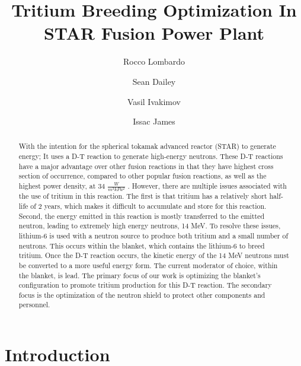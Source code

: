 \documentclass[runningheads]{llncs}
\begin{document}
%
\title{Tritium Breeding Optimization In STAR Fusion Power Plant}
%
%
\author{Rocco Lombardo \and
Sean Dailey\and
Vasil Ivakimov\and
Issac James}
%
%
%
\maketitle     %
%
\begin{abstract} 
With the intention for the spherical tokamak advanced reactor (STAR) to generate energy; It uses a D-T reaction to generate high-energy neutrons. 
These D-T reactions have a major advantage over other fusion reactions in that they have highest cross section of occurrence, compared to other popular fusion reactions, as well as the highest power density, at 34 $\frac{W}{m^3kPa^2}$
\cite{khodak2025}. 
However, there are multiple issues associated with the use of tritium in this reaction. The first is that tritium has a relatively short half-life of 2 years, which makes it difficult to accumulate and store for this reaction. Second, the energy emitted in this reaction is mostly transferred to the emitted neutron, leading to extremely high energy neutrons, 14 MeV. To resolve these issues, lithium-6 is used with a neutron source to produce both tritium and a small number of neutrons. This occurs within the blanket, which contains the lithium-6 to breed tritium. Once the D-T reaction occurs, the kinetic energy of the 14 MeV neutrons must be converted to a more useful energy form. The current moderator of choice, within the blanket, is lead. The primary focus of our work is optimizing the blanket's configuration to promote tritium production for this D-T reaction. The secondary focus is the optimization of the neutron shield to protect other components and personnel.


\end{abstract}
%
%
%
\section{Introduction}
\end{document}
